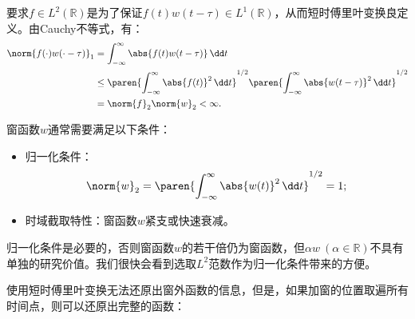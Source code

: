 要求$f\in L^2(\mathbb{R})$是为了保证$f(t)w(t-\tau)\in L^1(\mathbb{R})$，从而短时傅里叶变换良定义。由Cauchy不等式，有：
\begin{align}
    \norm{f(\cdot)w(\cdot-\tau)}_1&=\int_{-\infty}^{\infty}\abs{f(t)w(t-\tau)}\,\dd t\nonumber\\
    &\leq\paren{\int_{-\infty}^{\infty}\abs{f(t)}^2\,\dd t}^{1/2}\paren{\int_{-\infty}^{\infty}\abs{w(t-\tau)}^2\,\dd t}^{1/2}\nonumber\\
    &=\norm{f}_2\norm{w}_2<\infty.
\end{align}

窗函数$w$通常需要满足以下条件：
\begin{itemize}
    \item 归一化条件：
    \begin{equation}
        \norm{w}_2=\paren{\int_{-\infty}^{\infty}\abs{w(t)}^2\,\dd t}^{1/2}=1;
    \end{equation}
    \item 时域截取特性：窗函数$w$紧支或快速衰减。
\end{itemize}

归一化条件是必要的，否则窗函数$w$的若干倍仍为窗函数，但$\alpha w\ (\alpha\in\mathbb{R})$不具有单独的研究价值。我们很快会看到选取$L^2$范数作为归一化条件带来的方便。

使用短时傅里叶变换无法还原出窗外函数的信息，但是，如果加窗的位置取遍所有时间点，则可以还原出完整的函数：


